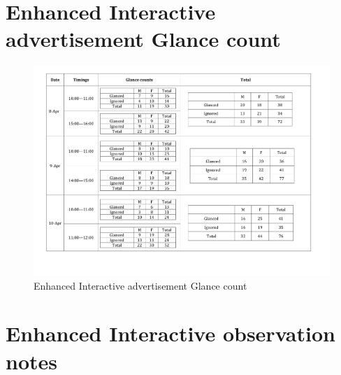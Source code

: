 \begin{appendices}
\section{Enhanced Interactive advertisement Glance count}

\begin{figure}[H]
 \centering 
    \includegraphics[width=\textwidth,height=0.5\textheight]{Appendices/9/new_body_glance.pdf}
    \caption{Enhanced Interactive advertisement Glance count}
     \label{app:EnhancedInteractiveadvertisementGlance}%
\end{figure}


\section{Enhanced Interactive observation notes}


\end{appendices}

